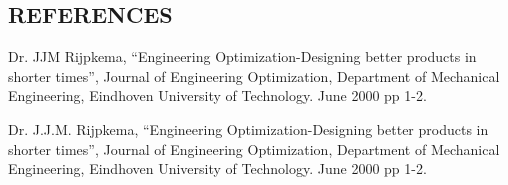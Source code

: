 \documentclass[12pt,a4paper]{article}
\numberwithin{figure}{section}
\numberwithin{table}{section}
\begin{document}
\newpage
\pagestyle{plain}
\begin{center}
\section*{REFERENCES}

\end{center}
\begin{enumerate}[label={[\arabic*]}]
  \item Dr. JJM Rijpkema, “Engineering Optimization-Designing better products in
shorter times”, Journal of Engineering Optimization, Department of Mechanical
Engineering, Eindhoven University of Technology. June 2000 pp 1-2.
\item Dr. J.J.M. Rijpkema, “Engineering Optimization-Designing better products in
shorter times”, Journal of Engineering Optimization, Department of Mechanical
Engineering, Eindhoven University of Technology. June 2000 pp 1-2.
\end{enumerate}
\end{document}
